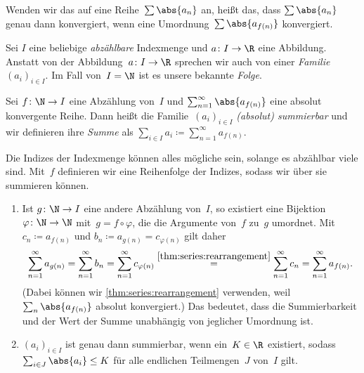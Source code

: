 \documentclass[a4paper]{article}
\begin{document}
Wenden wir das auf eine Reihe~$\sum \abs{a_n}$ an, heißt das, dass $\sum \abs{a_n}$ genau dann konvergiert, wenn eine Umordnung~$\sum \abs{a_{f(n)}}$ konvergiert.

\begin{definition}[Familie]
    Sei $I$ eine beliebige \emph{abzählbare} Indexmenge und $a\colon I\to\R$ eine Abbildung. Anstatt von der Abbildung~$a\colon I\to\R$ sprechen wir auch von einer \emph{Familie}~$(a_i)_{i\in I}$. Im Fall von~$I = \N$ ist es unsere bekannte \emph{Folge}.
\end{definition}

\begin{definition}
    Sei $f\colon \N\to I$ eine Abzählung von~$I$ und $\sum_{n=1}^\infty \abs{a_{f(n)}}$ eine absolut konvergente Reihe. Dann heißt die Familie~$(a_i)_{i\in I}$ \emph{(absolut) summierbar} und wir definieren ihre \emph{Summe} als $\sum_{i\in I} a_i \coloneqq \sum_{n=1}^\infty a_{f(n)}$.
\end{definition}

Die Indizes der Indexmenge können alles mögliche sein, solange es abzählbar viele sind. Mit~$f$ definieren wir eine Reihenfolge der Indizes, sodass wir über sie summieren können.

\begin{remark}\leavevmode
    \begin{enumerate}
        \item Ist $g\colon \N\to I$ eine andere Abzählung von~$I$, so existiert eine Bijektion~$\varphi\colon \N\to\N$ mit~$g = f\circ\varphi$, die die Argumente von~$f$ zu~$g$ umordnet. Mit~$c_n \coloneqq a_{f(n)}$ und $b_n \coloneqq a_{g(n)} = c_{\varphi(n)}$ gilt daher
              \begin{equation*}
                  \sum_{n=1}^\infty a_{g(n)} = \sum_{n=1}^\infty b_n = \sum_{n=1}^\infty c_{\varphi(n)} \overset{\eqref{thm:series:rearrangement}}{=} \sum_{n=1}^\infty c_n = \sum_{n=1}^\infty a_{f(n)}.
              \end{equation*}
              (Dabei können wir \cref{thm:series:rearrangement} verwenden, weil $\sum_n \abs{a_{f(n)}}$ absolut konvergiert.) Das bedeutet, dass die Summierbarkeit und der Wert der Summe unabhängig von jeglicher Umordnung ist.
        \item $(a_i)_{i\in I}$ ist genau dann summierbar, wenn ein~$K \in \R$ existiert, sodass $\sum_{i\in J} \abs{a_i} \leq K$ für alle endlichen Teilmengen~$J$ von~$I$ gilt.\label{rem:family:summation}
    \end{enumerate}
\end{remark}
\end{document}
